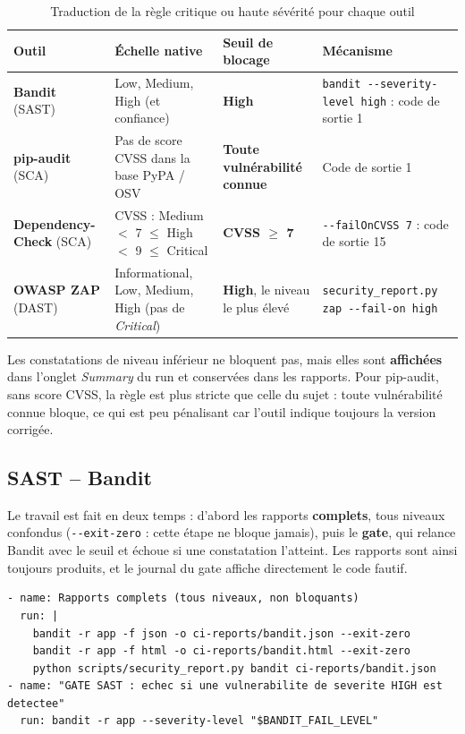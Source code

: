 \documentclass[11pt,a4paper]{article}
\newcommand{\code}[1]{\texttt{#1}}
\begin{document}
\begin{table}[H]
\centering
\small
\begin{tabularx}{\textwidth}{@{}lLLL@{}}
\toprule
\textbf{Outil} & \textbf{Échelle native} & \textbf{Seuil de blocage} & \textbf{Mécanisme} \\
\midrule
\textbf{Bandit} (SAST) & Low, Medium, High (et confiance) & \textbf{High} & \code{bandit -{}-severity-level high} : code de sortie 1 \\
\textbf{pip-audit} (SCA) & Pas de score CVSS dans la base PyPA / OSV & \textbf{Toute vulnérabilité connue} & Code de sortie 1 \\
\textbf{Dependency-Check} (SCA) & CVSS : Medium $<$ 7 $\leq$ High $<$ 9 $\leq$ Critical & \textbf{CVSS $\geq$ 7} & \code{-{}-failOnCVSS 7} : code de sortie 15 \\
\textbf{OWASP ZAP} (DAST) & Informational, Low, Medium, High (pas de \emph{Critical}) & \textbf{High}, le niveau le plus élevé & \code{security\_report.py zap -{}-fail-on high} \\
\bottomrule
\end{tabularx}
\caption{Traduction de la règle \og critique ou haute sévérité \fg{} pour chaque outil}
\end{table}

\noindent Les constatations de niveau inférieur ne bloquent pas, mais elles sont \textbf{affichées}
dans l'onglet \emph{Summary} du run et conservées dans les rapports. Pour pip-audit, sans score CVSS,
la règle est plus stricte que celle du sujet : toute vulnérabilité connue bloque, ce qui est peu
pénalisant car l'outil indique toujours la version corrigée.

\subsection{SAST -- Bandit}
Le travail est fait en deux temps : d'abord les rapports \textbf{complets}, tous niveaux confondus
(\code{-{}-exit-zero} : cette étape ne bloque jamais), puis le \textbf{gate}, qui relance Bandit avec le
seuil et échoue si une constatation l'atteint. Les rapports sont ainsi toujours produits, et le
journal du gate affiche directement le code fautif.

\begin{lstlisting}[caption={Étapes SAST du pipeline}]
- name: Rapports complets (tous niveaux, non bloquants)
  run: |
    bandit -r app -f json -o ci-reports/bandit.json --exit-zero
    bandit -r app -f html -o ci-reports/bandit.html --exit-zero
    python scripts/security_report.py bandit ci-reports/bandit.json
- name: "GATE SAST : echec si une vulnerabilite de severite HIGH est detectee"
  run: bandit -r app --severity-level "$BANDIT_FAIL_LEVEL"
\end{lstlisting}
\end{document}
